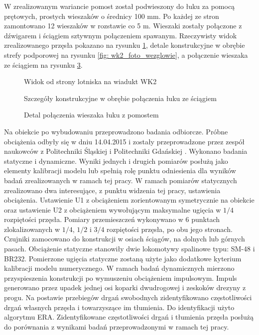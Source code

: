  W zrealizowanym wariancie pomost został podwieszony do łuku za pomocą prętowych, prostych wieszaków o średnicy 100 mm. Po każdej ze stron zamontowano 12 wieszaków w rozstawie co 5 m. Wieszaki zostały połączone z dźwigarem i ściągiem sztywnym połączeniem spawanym. Rzeczywisty widok zrealizowanego przęsła pokazano na rysunku \ref{fig: wk2_foto_widok_front}, detale konstrukcyjne w obrębie strefy podporowej na rysunku \ref{fig:  wk2_foto_wezglowie}, a połączenie wieszaka ze ściągiem na rysunku \ref{fig: wk2_foto_wieszak}.

\begin{figure}[h]
	\centering
	\captionsetup{justification=centering}
	\caption{Widok od strony lotniska na wiadukt WK2}
	\label{fig: wk2_foto_widok_front}
\end{figure}
\begin{figure}[h]
	\centering
	\qquad
	\captionsetup{justification=centering}
	\caption{Szczegóły konstrukcyjne w obrębie połączenia łuku ze ściągiem}
	\label{fig: wk2_foto_wezglowie}
\end{figure}
\begin{figure}[h]
	\centering
	\captionsetup{justification=centering}
	\caption{Detal połączenia wieszaka łuku z pomostem}
	\label{fig: wk2_foto_wieszak}
\end{figure}
Na obiekcie po wybudowaniu przeprowadzono badania odbiorcze. Próbne obciążenia odbyły się w dniu 14.04.2015 i zostały przeprowadzone przez zespół naukowców z Politechniki Śląskiej i Politechniki Gdańskiej \parencite{azinski2015}. Wykonano badania statyczne i dynamiczne. Wyniki jednych i drugich pomiarów posłużą jako elementy kalibracji modelu lub spełnią rolę punktu odniesienia dla wyników badań zrealizowanych w ramach tej pracy. W ramach pomiarów statycznych zrealizowano dwa interesujące, z punktu widzenia tej pracy, ustawienia obciążenia. Ustawienie U1 z obciążeniem zorientowanym symetrycznie na obiekcie oraz ustawienie U2 z obciążeniem wywołującym maksymalne ugięcia w $1/4$ rozpiętości przęsła. Pomiary przemieszczeń wykonywano w 6 punktach zlokalizowanych w $1/4$, $1/2$ i $3/4$ rozpiętości przęsła, po obu jego stronach. Czujniki zamocowano do konstrukcji w osiach ściągów, na dolnych lub górnych pasach. Obciążenie statyczne stanowiły dwie lokomotywy spalinowe typu: SM-48 i BR232. Pomierzone ugięcia statyczne zostaną użyte jako dodatkowe kyterium kalibracji modelu numerycznego.
W ramach badań dynamicznych mierzono przyspieszenia konstrukcji po wymuszeniu obciążeniem impulsowym. Impuls generowano przez upadek jednej osi koparki dwudrogowej i zeskoków drezyny z progu. Na postawie przebiegów drgań swobodnych zidentyfikowano częstotliwości drgań własnych przęsła i towarzyszące im tłumienia. Do identyfikacji użyto algorytmu ERA. Zidentyfikowane częstotliwości drgań i tłumienia przęsła posłużą do porównania z wynikami badań przeprowadzonymi w ramach tej pracy.


